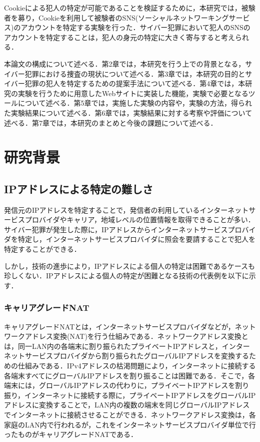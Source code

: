 \documentclass[10pt, a4paper]{jreport}
\begin{document}
Cookieによる犯人の特定が可能であることを検証するために，本研究では，被験者を募り，Cookieを利用して被験者のSNS(ソーシャルネットワーキングサービス)のアカウントを特定する実験を行った．サイバー犯罪において犯人のSNSのアカウントを特定することは，犯人の身元の特定に大きく寄与すると考えられる．

本論文の構成について述べる．第2章では，本研究を行う上での背景となる，サイバー犯罪における捜査の現状について述べる．第3章では，本研究の目的とサイバー犯罪の犯人を特定するための提案手法について述べる．第4章では，本研究の実験を行うために用意したWebサイトに実装した機能，実験で必要となるツールについて述べる．第5章では，実施した実験の内容や，実験の方法，得られた実験結果について述べる．第6章では，実験結果に対する考察や評価について述べる．第7章では，本研究のまとめと今後の課題について述べる．















\chapter{研究背景}
\section{IPアドレスによる特定の難しさ}
発信元のIPアドレスを特定することで，発信者の利用しているインターネットサービスプロバイダやキャリア，地域レベルの位置情報を取得できることが多い．サイバー犯罪が発生した際に，IPアドレスからインターネットサービスプロバイダを特定し，インターネットサービスプロバイダに照会を要請することで犯人を特定することができる．

しかし，技術の進歩により，IPアドレスによる個人の特定は困難であるケースも珍しくない．IPアドレスによる個人の特定が困難となる技術の代表例を以下に示す．

\subsection{キャリアグレードNAT}
キャリアグレードNATとは，インターネットサービスプロバイダなどが，ネットワークアドレス変換(NAT)を行う仕組みである．ネットワークアドレス変換とは，同一LAN内の各端末に割り振られたプライベートIPアドレスと，インターネットサービスプロバイダから割り振られたグローバルIPアドレスを変換するための仕組みである．IPv4アドレスの枯渇問題により，インターネットに接続する各端末すべてにグローバルIPアドレスを割り振ることは困難である．そこで，各端末には，グローバルIPアドレスの代わりに，プライベートIPアドレスを割り振り，インターネットに接続する際に，プライベートIPアドレスをグローバルIPアドレスに変換することで，LAN内の複数の端末を同じグローバルIPアドレスでインターネットに接続させることができる．ネットワークアドレス変換は，各家庭のLAN内で行われるが，これをインターネットサービスプロバイダ単位で行ったものがキャリアグレードNATである．
\end{document}

